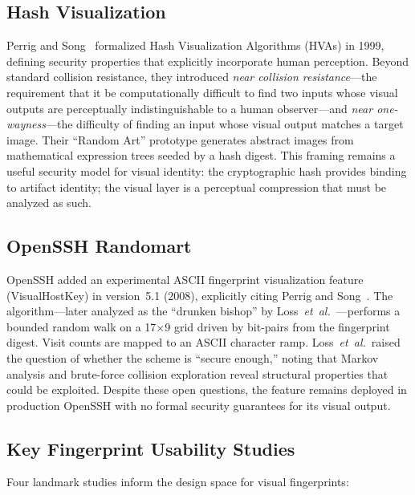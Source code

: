 \documentclass[conference,10pt]{IEEEtran}
\newcommand{\etal}{\textit{et~al.}}
\begin{document}
\subsection{Hash Visualization}

Perrig and Song~\cite{perrig1999hash} formalized Hash Visualization Algorithms (HVAs) in 1999, defining security properties that explicitly incorporate human perception.
Beyond standard collision resistance, they introduced \emph{near collision resistance}---the requirement that it be computationally difficult to find two inputs whose visual outputs are perceptually indistinguishable to a human observer---and \emph{near one-wayness}---the difficulty of finding an input whose visual output matches a target image.
Their ``Random Art'' prototype generates abstract images from mathematical expression trees seeded by a hash digest.
This framing remains a useful security model for visual identity: the cryptographic hash provides binding to artifact identity; the visual layer is a perceptual compression that must be analyzed as such.

\subsection{OpenSSH Randomart}

OpenSSH added an experimental ASCII fingerprint visualization feature (VisualHostKey) in version~5.1 (2008), explicitly citing Perrig and Song~\cite{openssh2008release}.
The algorithm---later analyzed as the ``drunken bishop'' by Loss~\etal~\cite{loss2009drunken}---performs a bounded random walk on a 17$\times$9 grid driven by bit-pairs from the fingerprint digest.
Visit counts are mapped to an ASCII character ramp.
Loss~\etal\ raised the question of whether the scheme is ``secure enough,'' noting that Markov analysis and brute-force collision exploration reveal structural properties that could be exploited.
Despite these open questions, the feature remains deployed in production OpenSSH with no formal security guarantees for its visual output.

\subsection{Key Fingerprint Usability Studies}

Four landmark studies inform the design space for visual fingerprints:
\end{document}
